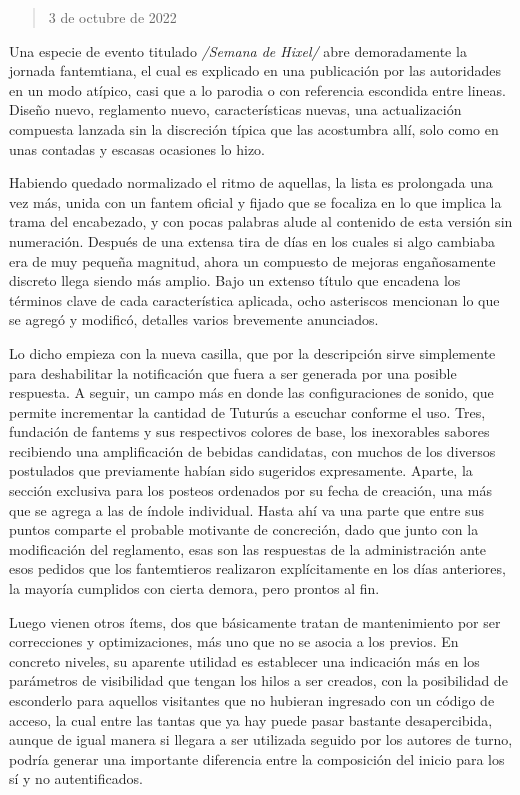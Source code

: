 \documentclass[
]{book}
\begin{document}
\begin{quote}
3 de octubre de 2022
\end{quote}

Una especie de evento titulado \emph{/Semana de Hixel/} abre demoradamente la jornada fantemtiana, el cual es explicado en una publicación por las autoridades en un modo atípico, casi que a lo parodia o con referencia escondida entre lineas. Diseño nuevo, reglamento nuevo, características nuevas, una actualización compuesta lanzada sin la discreción típica que las acostumbra allí, solo como en unas contadas y escasas ocasiones lo hizo.

Habiendo quedado normalizado el ritmo de aquellas, la lista es prolongada una vez más, unida con un fantem oficial y fijado que se focaliza en lo que implica la trama del encabezado, y con pocas palabras alude al contenido de esta versión sin numeración. Después de una extensa tira de días en los cuales si algo cambiaba era de muy pequeña magnitud, ahora un compuesto de mejoras engañosamente discreto llega siendo más amplio. Bajo un extenso título que encadena los términos clave de cada característica aplicada, ocho asteriscos mencionan lo que se agregó y modificó, detalles varios brevemente anunciados.

Lo dicho empieza con la nueva casilla, que por la descripción sirve simplemente para deshabilitar la notificación que fuera a ser generada por una posible respuesta. A seguir, un campo más en donde las configuraciones de sonido, que permite incrementar la cantidad de Tuturús a escuchar conforme el uso. Tres, fundación de fantems y sus respectivos colores de base, los inexorables sabores recibiendo una amplificación de bebidas candidatas, con muchos de los diversos postulados que previamente habían sido sugeridos expresamente. Aparte, la sección exclusiva para los posteos ordenados por su fecha de creación, una más que se agrega a las de índole individual. Hasta ahí va una parte que entre sus puntos comparte el probable motivante de concreción, dado que junto con la modificación del reglamento, esas son las respuestas de la administración ante esos pedidos que los fantemtieros realizaron explícitamente en los días anteriores, la mayoría cumplidos con cierta demora, pero prontos al fin.

Luego vienen otros ítems, dos que básicamente tratan de mantenimiento por ser correcciones y optimizaciones, más uno que no se asocia a los previos. En concreto niveles, su aparente utilidad es establecer una indicación más en los parámetros de visibilidad que tengan los hilos a ser creados, con la posibilidad de esconderlo para aquellos visitantes que no hubieran ingresado con un código de acceso, la cual entre las tantas que ya hay puede pasar bastante desapercibida, aunque de igual manera si llegara a ser utilizada seguido por los autores de turno, podría generar una importante diferencia entre la composición del inicio para los sí y no autentificados.
\end{document}
